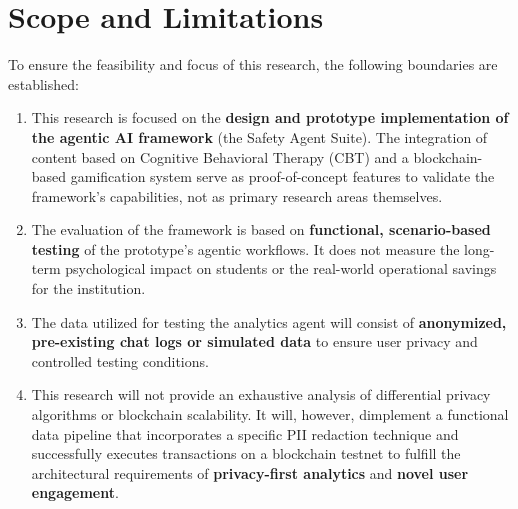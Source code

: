 
\section{Scope and Limitations}
\label{sec:scope_and_limitations}

To ensure the feasibility and focus of this research, the following boundaries are established:

\begin{enumerate}
    \item This research is focused on the \textbf{design and prototype implementation of the agentic AI framework} (the Safety Agent Suite). The integration of content based on Cognitive Behavioral Therapy (CBT) and a blockchain-based gamification system serve as proof-of-concept features to validate the framework's capabilities, not as primary research areas themselves.

    \item The evaluation of the framework is based on \textbf{functional, scenario-based testing} of the prototype's agentic workflows. It does not measure the long-term psychological impact on students or the real-world operational savings for the institution.

    \item The data utilized for testing the analytics agent will consist of \textbf{anonymized, pre-existing chat logs or simulated data} to ensure user privacy and controlled testing conditions.

    \item This research will not provide an exhaustive analysis of differential privacy algorithms or blockchain scalability. It will, however, dimplement a functional data pipeline that incorporates a specific PII redaction technique and successfully executes transactions on a blockchain testnet to fulfill the architectural requirements of \textbf{privacy-first analytics} and \textbf{novel user engagement}.
\end{enumerate}


